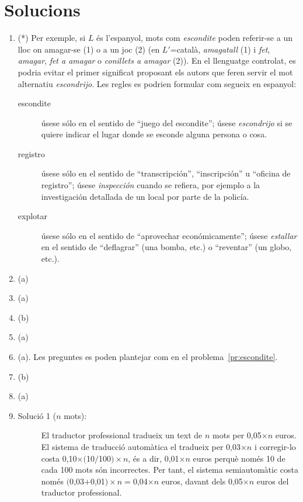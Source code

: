 \section{Solucions}
\begin{enumerate}
\item(*) \label{pr:escondite} Per exemple, si $L$ és l'espanyol, mots
  com {\em escondite} poden referir-se a un lloc on amagar-se (1) o a
  un joc (2) (en $L'$=català, \emph{amagatall} (1) i \emph{fet}, {\em
    amagar}, \emph{fet a amagar} o \emph{conillets a amagar} (2)). En
  el llenguatge controlat, es podria evitar el primer significat
  proposant els autors que feren servir el mot alternatiu {\em
    escondrijo}. Les regles es podrien formular com segueix en
  espanyol:
  {\sl
  \begin{description}
  \item[escondite] úsese sólo en el sentido de ``juego del
    escondite''; úsese \emph{escondrijo} si se quiere indicar el lugar
    donde se esconde alguna persona o cosa.
  \item[registro] úsese sólo en el sentido de ``transcripción'',
    ``inscripción'' u ``oficina de registro''; úsese \emph{inspección}
    cuando se refiera, por ejemplo a la investigación detallada de un
    local por parte de la policía.
  \item[explotar] úsese sólo en el sentido de ``aprovechar
    económicamente''; úsese \emph{estallar} en el sentido de
    ``deflagrar'' (una bomba, etc.) o ``reventar'' (un globo, etc.).
  \end{description}
}
\item (a)
\item (a)
\item (b)
\item (a)
\item (a). Les preguntes es poden plantejar com en el
  problema~\ref{pr:escondite}.
\item (b)
\item (a) 
\item
  \begin{description}
  \item [Solució 1 ($n$ mots):] El traductor professional tradueix un
    text de $n$ mots per 0,05$\times n$ euros. El sistema de traducció
    automàtica el tradueix per 0,03$\times n$ i corregir-lo costa
    0,10$\times($10$/$100$)\times n$, és a dir, 0,01$\times n$ euros
    perquè només 10 de cada 100 mots són incorrectes. Per tant, el
    sistema semiautomàtic costa només $($0,03$+$0,01$)\times n =
    $0,04$\times n$ euros, davant dels 0,05$\times n$ euros del
    traductor professional.
 

\end{description}
\end{enumerate}
